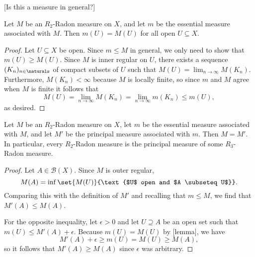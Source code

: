 \documentclass[article, a4paper, 11pt, oneside]{memoir}
\numberwithin{equation}{chapter}
\newcommand{\calB}{\mathcal{B}}
\newcommand{\borel}[1]{\calB(#1)}
\begin{document}
[Is this a measure in general?]

\begin{lemma}
    \label{thm:Radon-agree-on-open-sets}
    Let $M$ be an $R_2$-Radon measure on $X$, and let $m$ be the essential measure associated with $M$. Then $m(U) = M(U)$ for all open $U \subseteq X$.
\end{lemma}

\begin{proof}
    Let $U \subseteq X$ be open. Since $m \leq M$ in general, we only need to show that $m(U) \geq M(U)$. Since $M$ is inner regular on $U$, there exists a sequence $(K_n)_{n \in \naturals}$ of compact subsets of $U$ such that $M(U) = \lim_{n \to \infty} M(K_n)$. Furthermore, $M(K_n) < \infty$ because $M$ is locally finite, so since $m$ and $M$ agree when $M$ is finite it follows that
    \begin{equation*}
        M(U)
            = \lim_{n \to \infty} M(K_n)
            = \lim_{n \to \infty} m(K_n)
            \leq m(U),
    \end{equation*}
    as desired.
\end{proof}

\begin{proposition}
    Let $M$ be an $R_2$-Radon measure on $X$, let $m$ be the essential measure associated with $M$, and let $M'$ be the principal measure associated with $m$. Then $M = M'$. In particular, every $R_2$-Radon measure is the principal measure of some $R_3$-Radon measure.
\end{proposition}

\begin{proof}
    Let $A \in \borel{X}$. Since $M$ is outer regular,
    \begin{equation*}
        M(A)
            = \inf \set{M(U)}{\text{$U$ open and $A \subseteq U$}}.
    \end{equation*}
    Comparing this with the definition of $M'$ and recalling that $m \leq M$, we find that $M'(A) \leq M(A)$.

    For the opposite inequality, let $\epsilon > 0$ and let $U \supseteq A$ be an open set such that $m(U) \leq M'(A) + \epsilon$. Because $m(U) = M(U)$ by [lemma], we have
    \begin{equation*}
        M'(A) + \epsilon
            \geq m(U)
            = M(U)
            \geq M(A),
    \end{equation*}
    so it follows that $M'(A) \geq M(A)$ since $\epsilon$ was arbitrary.
\end{proof}


\nocite{*}

\printbibliography
\end{document}
